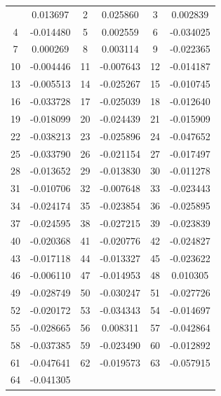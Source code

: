 \documentclass[12pt]{article}
\begin{document}
\begin{longtable}{@{}cc|cc|cc@{}}
\bottomrule
\endlastfoot
1 & 0.013697 & 2 & 0.025860 & 3 & 0.002839 \\
4 & -0.014480 & 5 & 0.002559 & 6 & -0.034025 \\
7 & 0.000269 & 8 & 0.003114 & 9 & -0.022365 \\
10 & -0.004446 & 11 & -0.007643 & 12 & -0.014187 \\
13 & -0.005513 & 14 & -0.025267 & 15 & -0.010745 \\
16 & -0.033728 & 17 & -0.025039 & 18 & -0.012640 \\
19 & -0.018099 & 20 & -0.024439 & 21 & -0.015909 \\
22 & -0.038213 & 23 & -0.025896 & 24 & -0.047652 \\
25 & -0.033790 & 26 & -0.021154 & 27 & -0.017497 \\
28 & -0.013652 & 29 & -0.013830 & 30 & -0.011278 \\
31 & -0.010706 & 32 & -0.007648 & 33 & -0.023443 \\
34 & -0.024174 & 35 & -0.023854 & 36 & -0.025895 \\
37 & -0.024595 & 38 & -0.027215 & 39 & -0.023839 \\
40 & -0.020368 & 41 & -0.020776 & 42 & -0.024827 \\
43 & -0.017118 & 44 & -0.013327 & 45 & -0.023622 \\
46 & -0.006110 & 47 & -0.014953 & 48 & 0.010305 \\
49 & -0.028749 & 50 & -0.030247 & 51 & -0.027726 \\
52 & -0.020172 & 53 & -0.034343 & 54 & -0.014697 \\
55 & -0.028665 & 56 & 0.008311 & 57 & -0.042864 \\
58 & -0.037385 & 59 & -0.023490 & 60 & -0.012892 \\
61 & -0.047641 & 62 & -0.019573 & 63 & -0.057915 \\
64 & -0.041305 &  &  &  &  \\

\end{longtable}
\end{document}

